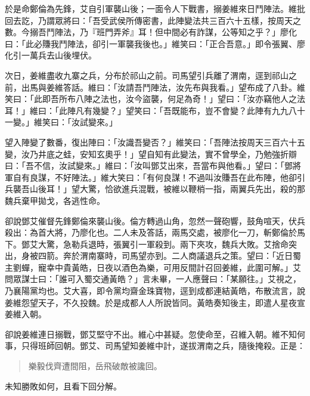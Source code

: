 於是命鄭倫為先鋒，艾自引軍襲山後；一面令人下戰書，搦姜維來日鬥陣法。維批回去訖，乃謂眾將曰：「吾受武侯所傳密書，此陣變法共三百六十五樣，按周天之數。今搦吾鬥陣法，乃『班門弄斧』耳！但中間必有詐謀，公等知之乎？」廖化曰：「此必賺我鬥陣法，卻引一軍襲我後也。」維笑曰：「正合吾意。」即令張翼、廖化引一萬兵去山後埋伏。

次日，姜維盡收九寨之兵，分布於祁山之前。司馬望引兵離了渭南，逕到祁山之前，出馬與姜維答話。維曰：「汝請吾鬥陣法，汝先布與我看。」望布成了八卦。維笑曰：「此即吾所布八陣之法也，汝今盜襲，何足為奇！」望曰：「汝亦竊他人之法耳！」維曰：「此陣凡有幾變？」望笑曰：「吾既能布，豈不會變？此陣有九九八十一變。」維笑曰：「汝試變來。」

望入陣變了數番，復出陣曰：「汝識吾變否？」維笑曰：「吾陣法按周天三百六十五變，汝乃井底之蛙，安知玄奧乎！」望自知有此變法，實不曾學全，乃勉強折辯曰：「吾不信，汝試變來。」維曰：「汝叫鄧艾出來，吾當布與他看。」望曰：「鄧將軍自有良謀，不好陣法。」維大笑曰：「有何良謀！不過叫汝賺吾在此布陣，他卻引兵襲吾山後耳！」望大驚，恰欲進兵混戰，被維以鞭梢一指，兩翼兵先出，殺的那魏兵棄甲拋戈，各逃性命。

卻說鄧艾催督先鋒鄭倫來襲山後。倫方轉過山角，忽然一聲砲響，鼓角喧天，伏兵殺出：為首大將，乃廖化也。二人未及答話，兩馬交處，被廖化一刀，斬鄭倫於馬下。鄧艾大驚，急勒兵退時，張翼引一軍殺到。兩下夾攻，魏兵大敗。艾捨命突出，身被四箭。奔於渭南寨時，司馬望亦到。二人商議退兵之策。望曰：「近日蜀主劉蟬，寵幸中貴黃皓，日夜以酒色為樂，可用反間計召回姜維，此圍可解。」艾問眾謀士曰：「誰可入蜀交通黃皓？」言未畢，一人應聲曰：「某願往。」艾視之，乃襄陽黨均也。艾大喜，即令黨均齋金珠寶物，逕到成都連結黃皓，布散流言，說姜維怨望天子，不久投魏。於是成都人人所說皆同。黃皓奏知後主，即遣人星夜宣姜維入朝。

卻說姜維連日搦戰，鄧艾堅守不出。維心中甚疑。忽使命至，召維入朝。維不知何事，只得班師回朝。鄧艾、司馬望知姜維中計，遂拔渭南之兵，隨後掩殺。正是：

\begin{quote}
樂毅伐齊遭間阻，岳飛破敵被讒回。
\end{quote}

未知勝敗如何，且看下回分解。
